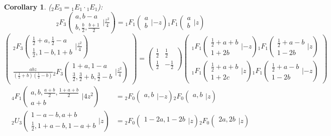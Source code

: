 \documentclass[12pt]{article}
\numberwithin{equation}{section}
\newtheorem{corollary}[theorem]{Corollary}
\newcommand{\Head}[3] {{}_{#1}{#2}_{#3}}
\newcommand{\ArgS}[3] {( \begin{smallmatrix} #1 \\ #2 \end{smallmatrix} | {#3})}
\begin{document}
\begin{corollary}
($\Head{2}{E}{3} = \Head{1}{E}{1} \cdot \Head{1}{E}{1}$):
\begin{equation*}
\Head{2}{F}{3} \ArgS{a, b - a}{b, \frac{b}{2}, \frac{b + 1}{2}}{\tfrac{z^2}{4}} = \Head{1}{F}{1} \ArgS{a}{b}{-z} \Head{1}{F}{1} \ArgS{a}{b}{z}
\end{equation*}
\begin{equation*}
\left(\begin{array}{r}
\Head{2}{F}{3} \ArgS{\frac12+a,\frac12-a}{\frac{1}{2}, 1-b, 1+b}{\tfrac{z^2}{4}}\\
\frac{a b z}{(\frac12+b)(\frac12-b)} \Head{2}{F}{3} \ArgS{1+a,1-a}{\frac32, \frac32+b, \frac32-b}{\tfrac{z^2}{4}}
\end{array}\right)
 =
\begin{pmatrix}
\tfrac12 & \tfrac12 \\
\tfrac12 & -\tfrac12
\end{pmatrix}
\begin{pmatrix}
\Head{1}{F}{1}\ArgS{\frac12+a+b}{1+2b}{-z} \Head{1}{F}{1}\ArgS{\frac12+a-b}{1-2b}{z}
\\
\Head{1}{F}{1} \ArgS{\frac12+a+b}{1+2c}{z}\Head{1}{F}{1} \ArgS{\frac12+a-b}{1-2b}{-z} \end{pmatrix}
\end{equation*}
\begin{align*}
\Head{4}{F}{1} \ArgS{a, b, \frac{a+b}{2}, \frac{1+a+b}{2}}{a + b}{4 z^2} &= \Head{2}{F}{0} \ArgS{a, b}{}{-z}\Head{2}{F}{0}\ArgS{a, b}{}{z}\\
\Head{2}{U}{3} \ArgS{1 - a - b, a + b}{\frac12, 1 + a - b, 1 - a + b}{z} &= \Head{2}{F}{0} \ArgS{1 - 2 a, 1 - 2 b}{}{z} \Head{2}{F}{0} \ArgS{2 a, 2 b} {}{z} 
\end{align*}
\end{corollary}
\end{document}
